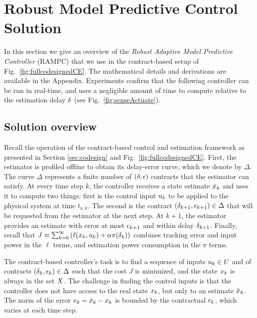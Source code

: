 \section{Robust Model Predictive Control Solution}
\label{robustMPC}

In this section we give an overview of the \emph{Robust Adaptive Model Predictive Controller} (RAMPC) that we use in the contract-based setup of Fig.~\ref{fig:fullcodesignedCE}.
The mathematical details and derivations are available in the Appendix.
Experiments confirm that the following controller can be run in real-time, and uses a negligible amount of time to compute relative to the estimation delay $\delta$ (see Fig.~\ref{fig:senseActuate}).

\subsection{Solution overview}
Recall the operation of the contract-based control and estimation framework as presented in Section \ref{sec:codesign} and Fig.~\ref{fig:fullcodesignedCE}.
First, the estimator is profiled offline to obtain its delay-error curve, which we denote by $\Delta$.
The curve $\Delta$ represents a finite number of $(\delta,\epsilon)$ contracts that the estimator can satisfy.
At every time step $k$, the controller receives a state estimate $\hat{x}_k$ and uses it to compute two things:
first is the control input $u_{k}$ to be applied to the physical system at time $t_{a,k}$.
The second is the contract $(\delta_{k+1}, \epsilon_{k+1}) \in \Delta$ that will be requested from the estimator at the next step.
At $k+1$, the estimator provides an estimate with error at most $\epsilon_{k+1}$ and within delay $\delta_{k+1}$.
Finally, recall that $J = \sum_{k=0}^{\infty}\left(\ell(x_k,u_k)+ \alpha \pi(\delta_k)\right)$ combines tracking error and input power in the $\ell$ terms, and estimation power consumption in the $\pi$ terms.

The contract-based controller's task is to find a sequence of inputs $u_k \in U$ and of contracts $(\delta_k, \epsilon_k) \in \Delta$ such that the cost $J$ is minimized, and the state $x_k$ is always in the set $X$.
The challenge in finding the control inputs is that the controller does not have access to the real state $x_k$, but only to an estimate $\hat{x}_k$.
The norm of the error $e_k = \hat{x}_k - x_k$ is bounded by the contractual $\epsilon_k$, which varies at each time step.

